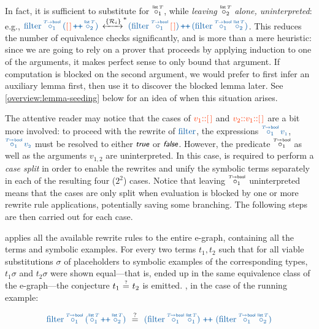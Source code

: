 In fact, it is sufficient to substitute for $\pholder{1}{\tlist\,T}$, while \emph{leaving} $\pholder{2}{\tlist\,T}$ \emph{alone, uninterpreted}:
e.g., 
$
\TRewriteSysRelation
  {\clrterm\tfilter\pholder{1}{T\!\to\tbool}({\clrsymex\lnil}
    \concat \pholder{2}{\tlist\,T})}
  {\clrterm{(\tfilter\pholder{1}{T\!\to\tbool}{\clrsymex\lnil})}
    \concat 
    {(\tfilter\pholder{1}{T\!\to\tbool}\pholder{2}{\tlist\,T})}}
$.
This reduces the number of equivalence checks significantly,
and is more than a mere heuristic:
since we are going to rely on a prover that proceeds by applying induction to one of the arguments, it makes perfect sense to only bound that argument.
If computation is blocked on the second argument, we would prefer to first infer an auxiliary lemma first, then use it to discover the blocked lemma later.
See \autoref{overview:lemma-seeding} below for an idea of when this situation arises.

The attentive reader may notice that the cases of
$\clrsymex v_1{\cons}\lnil$ and
$\clrsymex v_2{\cons}v_1{\cons}\lnil$
are a bit more involved:
to proceed with the rewrite of $\clrterm\tfilter$, the expressions
$\clrterm\pholder{1}{T\!\to\tbool}\,v_{\scriptscriptstyle 1}$,
$\clrterm\pholder{1}{T\!\to\tbool}\,v_{\scriptscriptstyle 2}$
must be resolved to either $\ttrue$ or $\tfalse$.
However, the predicate $\pholder{1}{T\!\to\tbool}$ as well as the arguments $v_{\scriptscriptstyle 1,2}$ are uninterpreted.
In this case, \TheSy is required to perform a \emph{case split} in order to enable the rewrites and unify the symbolic terms separately in each of the resulting four ({\small $2^2$}) cases.
Notice that leaving $\pholder{1}{T\!\to\tbool}$ uninterpreted means that the cases are only split when evaluation is blocked by one or more rewrite rule applications, potentially saving some branching.
The following steps are then carried out for each case.

\TheSy applies all the available rewrite rules to the entire e-graph, containing all the terms and symbolic examples.
For every two terms $t_1,t_2$ such that for all viable substitutions $\sigma$ of placeholders to symbolic examples of the corresponding types, $t_1\sigma$ and $t_2\sigma$ were shown equal---that is, ended up in the same equivalence class of the e-graph---the conjecture $t_1\operatorname{\overset{\scriptscriptstyle ?}{\,=\,}} t_2$ is emitted. \Eg, in the case of the running example:

\[
{\clrterm
  \tfilter\pholder{1}{T\!\to\tbool}(
    \pholder{1}{\tlist\,T} \concat 
    \pholder{2}{\tlist\,T})}
~\maybeEq~
{\clrterm
  {(\tfilter\pholder{1}{T\!\to\tbool}
    \pholder{1}{\tlist\,T})}
    \,\concat\,
  {(\tfilter\pholder{1}{T\!\to\tbool}
    \pholder{2}{\tlist\,T})}}
\]

